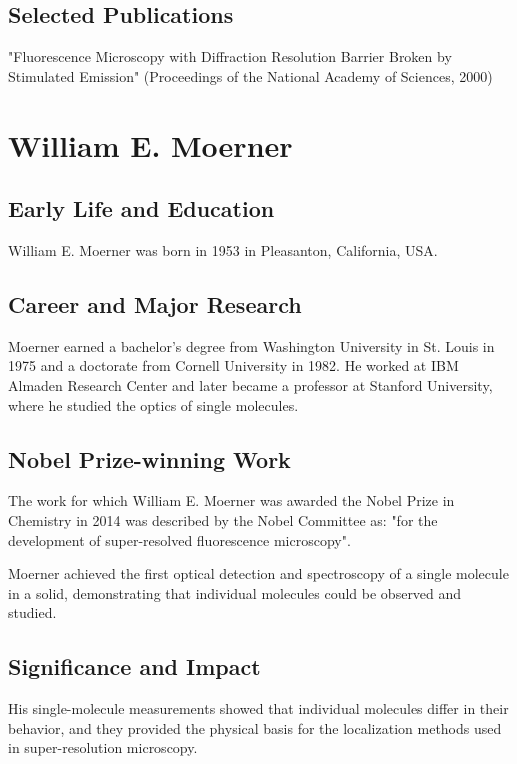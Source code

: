 \subsection*{Selected Publications}

"Fluorescence Microscopy with Diffraction Resolution Barrier Broken by Stimulated Emission" (Proceedings of the National Academy of Sciences, 2000)

\clearpage

\section{William E. Moerner}

\subsection*{Early Life and Education}

William E. Moerner was born in 1953 in Pleasanton, California, USA.

\subsection*{Career and Major Research}

Moerner earned a bachelor's degree from Washington University in St. Louis in 1975 and a doctorate from Cornell University in 1982. He worked at IBM Almaden Research Center and later became a professor at Stanford University, where he studied the optics of single molecules.

\subsection*{Nobel Prize-winning Work}

The work for which William E. Moerner was awarded the Nobel Prize in Chemistry in 2014 was described by the Nobel Committee as: "for the development of super-resolved fluorescence microscopy".

Moerner achieved the first optical detection and spectroscopy of a single molecule in a solid, demonstrating that individual molecules could be observed and studied.

\subsection*{Significance and Impact}

His single-molecule measurements showed that individual molecules differ in their behavior, and they provided the physical basis for the localization methods used in super-resolution microscopy.

